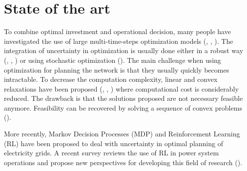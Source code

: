 \section{State of the art}
\label{sec:stateart}

To combine optimal investment and operational decision, many people have investigated the use of large multi-time-steps optimization models (\cite{zonal_int}, \cite{Baker2012OptimalIO}, \cite{paolone}).
The integration of uncertainty in optimization is usually done either in a robust way (\cite{LorcaSun}, \cite{adaptative}, \cite{BM2}) or using stochastic optimization (\cite{Oren}).
The main challenge when using optimization for planning the network is that they usually quickly becomes intractable.
To decrease the computation complexity, linear and convex relaxations have been proposed (\cite{Farivar_Relax1}, \cite{Farivar_Relax2}, \cite{BM1}) where computational cost is considerably reduced.
The drawback is that the solutions proposed are not necessary feasible anymore.
Feasibility can be recovered by solving a sequence of convex problems (\cite{Nali}).

More recently, Markov Decision Processes (MDP) and Reinforcement Learning (RL) have been proposed to deal with uncertainty in optimal planning of electricity grids.
A recent survey reviews the use of RL in power system operations and propose new perspectives for developing this field of research (\cite{RLSurvey}).
